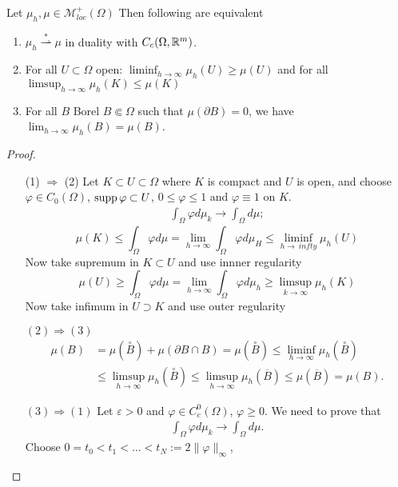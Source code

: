 \begin{theorem}
Let $\mu_h, \mu \in \mathcal{M}_{loc}^+(\Omega)$ Then following are equivalent
\begin{enumerate}[(1)]
\item $\mu_h \stackrel {*}{\rightharpoonup} \mu$ in duality with
$C_c(\Omega,\mathbb{R}^m)$.
\item For all $U \subset \Omega$ open: $\liminf _{h\to \infty} \mu_h(U) \geq
\mu(U)$ and for all $\limsup_{h \to \infty} \mu_h(K) \leq \mu(K)$ 
\item For all $B$ Borel $B\Subset \Omega$ such that $\mu(\partial B) = 0$, we
have $\lim_{h\to \infty} \mu_h(B) = \mu(B)$.
\end{enumerate}
\end{theorem}
\begin{proof}
\TODO
\begin{enumerate}[(1)]
\item[(1) $\Rightarrow$ (2)] Let $K\subset U \subset \Omega$ where $K$ is compact and $U$ is open, and
choose $\varphi \in C_0(\Omega)$, $\operatorname{supp} \varphi \subset U$, $0 \leq \varphi
\leq 1$ and $\varphi \equiv 1$ on $K$.
\[
\begin{aligned}
\int_\Omega \varphi d\mu_k \to \int_\Omega d\mu;
\end{aligned}
\]
\TODO
\[
\mu(K) \leq \int_\Omega \varphi d\mu = \lim_{h\to \infty} \int_\Omega \varphi
d\mu_H \leq \liminf_{h\to\ infty} \mu_h(U)
\]
Now take supremum in $K \subset U$ and use innner regularity
\[
\mu(U) \geq \int_\Omega \varphi d\mu = \lim_{h\to \infty} \int_\Omega \varphi
d\mu_h \geq \limsup_{k\to \infty} \mu_h(K)
\]
Now take infimum in $U \supset K$ and use outer regularity
\item[$(2) \Rightarrow (3)$] 
\[
\begin{aligned}
\mu(B) &= \mu(\overset{\circ}{B}) + \mu(\partial B \cap B) =
\mu(\overset{\circ}{B}) \leq \liminf_{h\to\infty} \mu_h(\overset{\circ}{B}) 
\\ &\leq \limsup_{h\to\infty} \mu_h(\overset{\circ}{B})
\leq \limsup_{h\to\infty} \mu_h(\overline{B}) \leq \mu(\overline{B}) = \mu(B).
\end{aligned}
\]
\item[$(3) \Rightarrow (1)$] Let $\varepsilon >0$ and $\varphi \in
C^0_c(\Omega)$, $\varphi \geq 0$. We need to prove that 
\[
\begin{aligned}
\int_\Omega \varphi d\mu_k \to \int_\Omega d\mu.
\end{aligned}
\]
Choose $0 = t_0 < t_1 < \dots < t_N := 2\|\varphi\|_\infty$, 

\end{enumerate}
\end{proof}
